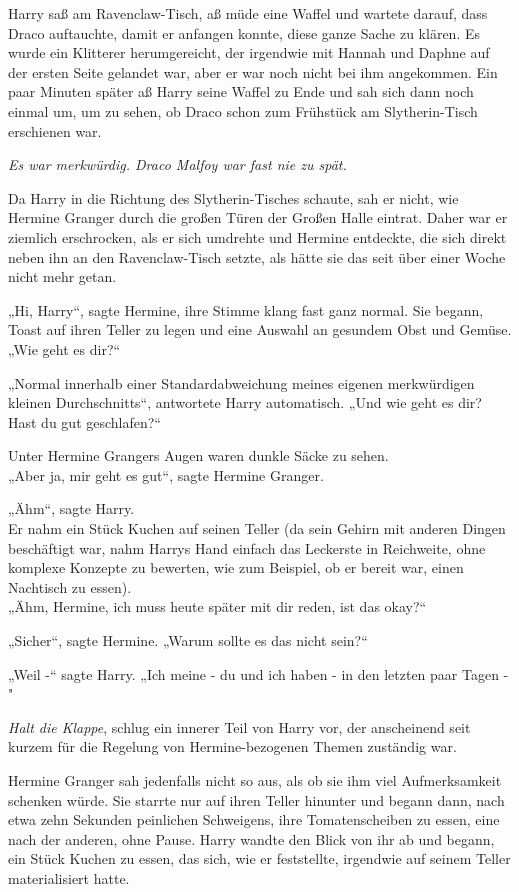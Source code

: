 {Harry saß am Ravenclaw-Tisch, aß müde eine Waffel und wartete darauf, dass Draco auftauchte, damit er anfangen konnte, diese ganze Sache zu klären. Es wurde ein Klitterer herumgereicht, der irgendwie mit Hannah und Daphne auf der ersten Seite gelandet war, aber er war noch nicht bei ihm angekommen. Ein paar Minuten später aß Harry seine Waffel zu Ende und sah sich dann noch einmal um, um zu sehen, ob Draco schon zum Frühstück am Slytherin-Tisch erschienen war.

\emph{Es war merkwürdig. Draco Malfoy war fast nie zu spät.}

Da Harry in die Richtung des Slytherin-Tisches schaute, sah er nicht, wie Hermine Granger durch die großen Türen der Großen Halle eintrat. Daher war er ziemlich erschrocken, als er sich umdrehte und Hermine entdeckte, die sich direkt neben ihn an den Ravenclaw-Tisch setzte, als hätte sie das seit über einer Woche nicht mehr getan.

„Hi, Harry“, sagte Hermine, ihre Stimme klang fast ganz normal. Sie begann, Toast auf ihren Teller zu legen und eine Auswahl an gesundem Obst und Gemüse.\\ „Wie geht es dir?“

„Normal innerhalb einer Standardabweichung meines eigenen merkwürdigen kleinen Durchschnitts“, antwortete Harry automatisch. „Und wie geht es dir? Hast du gut geschlafen?“

Unter Hermine Grangers Augen waren dunkle Säcke zu sehen.\\ „Aber ja, mir geht es gut“, sagte Hermine Granger.

„Ähm“, sagte Harry.\\ Er nahm ein Stück Kuchen auf seinen Teller (da sein Gehirn mit anderen Dingen beschäftigt war, nahm Harrys Hand einfach das Leckerste in Reichweite, ohne komplexe Konzepte zu bewerten, wie zum Beispiel, ob er bereit war, einen Nachtisch zu essen).\\ „Ähm, Hermine, ich muss heute später mit dir reden, ist das okay?“

„Sicher“, sagte Hermine. „Warum sollte es das nicht sein?“

„Weil -“ sagte Harry. „Ich meine - du und ich haben - in den letzten paar Tagen -"

\emph{Halt die Klappe}, schlug ein innerer Teil von Harry vor, der anscheinend seit kurzem für die Regelung von Hermine-bezogenen Themen zuständig war.

Hermine Granger sah jedenfalls nicht so aus, als ob sie ihm viel Aufmerksamkeit schenken würde. Sie starrte nur auf ihren Teller hinunter und begann dann, nach etwa zehn Sekunden peinlichen Schweigens, ihre Tomatenscheiben zu essen, eine nach der anderen, ohne Pause. Harry wandte den Blick von ihr ab und begann, ein Stück Kuchen zu essen, das sich, wie er feststellte, irgendwie auf seinem Teller materialisiert hatte.

}
